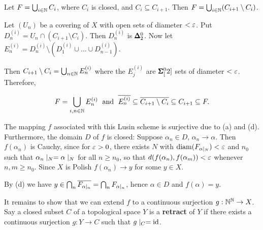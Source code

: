 Let $F= \bigcup_{i \in \mathbb{N}} C_i$, where $C_i$ is closed, and $C_i \subseteq C_{i+1}$. Then $F= \bigcup_{i \in \mathbb{N}}(C_{i+1} \setminus C_i)$.

Let $(U_n)$ be a covering of $X$ with open sets of diameter $< \varepsilon$. Put $D^{(i)}_n = U_n \cap (C_{i+1} \setminus C_i)$. Then $D^{(i)}_n$ is $\pmb{\Delta}^0_2$. Now let $E^{(i)}_n = D^{(i)}_n \setminus (D^{(i)}_1 \cup \dots \cup D^{(i)}_{n -1})$.

Then $C_{i+1} \setminus C_i = \bigcup_{n \in \mathbb{N}} E^{(i)}_n$ where the $E^{(i)}_j$ are $\pmb{\Sigma}^0_{[}2]$ sets of diameter $<\varepsilon$. Therefore,

\begin{equation*}
F =  \bigcup_{i,n\in \mathbb{N}} E^{(i)}_n \; \text{ and } \;  \overline{E^{(i)}_n} \subseteq \overline{C_{i+1} \setminus C_i} \subseteq C_{i+1} \subseteq F.
\end{equation*}

The mapping $f$ associated with this Lusin scheme is surjective due to (a) and (d).
Furthermore, the domain $D$ of $f$ is closed: Suppose $\alpha_n \in D$, $\alpha_n \to \alpha$. Then $f(\alpha_n)$ is Cauchy, since for $\varepsilon > 0$, there exists $N$ with $\mathrm{diam}(F_{\alpha\mid_{N}}) < \varepsilon$ and $n_0$ such that $\alpha_n\mid_{N} = \alpha\mid_{N}$ for all $n \geq n_0$, so that $d(f(\alpha_n),f(\alpha_m)) < \varepsilon$ whenever $n,m \geq n_0$. Since $X$ is Polish $f(\alpha_n) \to y$ for some $y \in X$.

By (d) we have $y \in \bigcap_n \overline{F_{\alpha\mid_{n}}} = \bigcap_n F_{\alpha\mid_{n}}$, hence $\alpha \in D$ and $f(\alpha) = y$.

It remains to show that we can extend $f$ to a continuous surjection $g: \mathbb{N}^{\mathbb{N}} \to X$. Say a closed subset $C$ of a topological space $Y$ is a \textbf{retract} of $Y$ if there exists a continuous surjection $g: Y \to C$ such that $g\mid_{C} = \operatorname{id}$.

